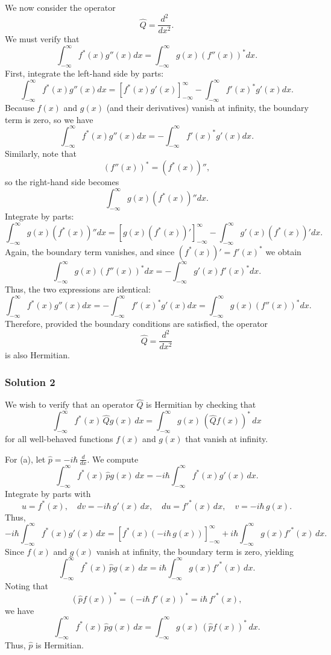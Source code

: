 \documentclass{article}
\begin{document}
We now consider the operator
\[
\hat{Q} = \frac{d^2}{dx^2}.
\]
We must verify that
\[
\int_{-\infty}^{\infty} f^*(x) g''(x) dx = \int_{-\infty}^{\infty} g(x) \left(f''(x)\right)^* dx.
\]
First, integrate the left-hand side by parts:
\[
\int_{-\infty}^{\infty} f^*(x) g''(x) dx = \left[ f^*(x) g'(x) \right]_{-\infty}^{\infty} - \int_{-\infty}^{\infty} f'(x)^* g'(x) dx.
\]
Because \(f(x)\) and \(g(x)\) (and their derivatives) vanish at infinity, the boundary term is zero, so we have
\[
\int_{-\infty}^{\infty} f^*(x) g''(x) dx = - \int_{-\infty}^{\infty} f'(x)^* g'(x) dx.
\]
Similarly, note that
\[
\left(f''(x)\right)^* = \left(f^*(x)\right)'',
\]
so the right-hand side becomes
\[
\int_{-\infty}^{\infty} g(x) \left(f^*(x)\right)'' dx.
\]
Integrate by parts:
\[
\int_{-\infty}^{\infty} g(x) \left(f^*(x)\right)'' dx = \left[ g(x) \left(f^*(x)\right)' \right]_{-\infty}^{\infty} - \int_{-\infty}^{\infty} g'(x) \left(f^*(x)\right)' dx.
\]
Again, the boundary term vanishes, and since \(\left(f^*(x)\right)' = f'(x)^*\) we obtain
\[
\int_{-\infty}^{\infty} g(x) \left(f''(x)\right)^* dx = - \int_{-\infty}^{\infty} g'(x) f'(x)^* dx.
\]
Thus, the two expressions are identical:
\[
\int_{-\infty}^{\infty} f^*(x) g''(x) dx = - \int_{-\infty}^{\infty} f'(x)^* g'(x) dx = \int_{-\infty}^{\infty} g(x) \left(f''(x)\right)^* dx.
\]
Therefore, provided the boundary conditions are satisfied, the operator
\[
\hat{Q} = \frac{d^2}{dx^2}
\]
is also Hermitian.

\subsubsection{Solution 2}

We wish to verify that an operator $\hat{Q}$ is Hermitian by checking that 
\[
\int_{-\infty}^{\infty} f^*(x)\, \hat{Q}g(x) \, dx = \int_{-\infty}^{\infty} g(x)\, \left(\hat{Q}f(x)\right)^* \, dx
\]
for all well-behaved functions $f(x)$ and $g(x)$ that vanish at infinity.

For (a), let $\hat{p} = -i\hbar\, \frac{d}{dx}$. We compute
\[
\int_{-\infty}^{\infty} f^*(x)\, \hat{p} g(x) \, dx = -i\hbar \int_{-\infty}^{\infty} f^*(x) g'(x) \, dx.
\]
Integrate by parts with 
\[
u=f^*(x), \quad dv=-i\hbar\,g'(x)\,dx, \quad du=f'^*(x)\,dx, \quad v=-i\hbar\,g(x).
\]
Thus,
\[
- i\hbar \int_{-\infty}^{\infty} f^*(x) g'(x) \, dx = \left[f^*(x)(-i\hbar\, g(x))\right]_{-\infty}^{\infty} + i\hbar \int_{-\infty}^{\infty} g(x) f'^*(x) \, dx.
\]
Since $f(x)$ and $g(x)$ vanish at infinity, the boundary term is zero, yielding
\[
\int_{-\infty}^{\infty} f^*(x)\, \hat{p}g(x) \, dx = i\hbar \int_{-\infty}^{\infty} g(x) f'^*(x) \, dx.
\]
Noting that 
\[
\left(\hat{p}f(x)\right)^* = \left(-i\hbar\,f'(x)\right)^* = i\hbar\, f'^*(x),
\]
we have
\[
\int_{-\infty}^{\infty} f^*(x)\, \hat{p}g(x) \, dx = \int_{-\infty}^{\infty} g(x)\,\left(\hat{p}f(x)\right)^* \, dx.
\]
Thus, $\hat{p}$ is Hermitian.
\end{document}
